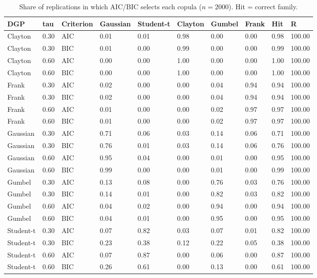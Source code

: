 \begin{table}[htbp]\centering\small
\caption{Share of replications in which AIC/BIC selects each copula ($n = 2000$). Hit = correct family.}\label{tab:mc-select}
\begin{tabular}{llllllllll}
\hline
DGP & tau & Criterion & Gaussian & Student-t & Clayton & Gumbel & Frank & Hit & R
\\ \hline
Clayton & 0.30 & AIC & 0.01 & 0.01 & 0.98 & 0.00 & 0.00 & 0.98 & 100.00 \\
Clayton & 0.30 & BIC & 0.01 & 0.00 & 0.99 & 0.00 & 0.00 & 0.99 & 100.00 \\
Clayton & 0.60 & AIC & 0.00 & 0.00 & 1.00 & 0.00 & 0.00 & 1.00 & 100.00 \\
Clayton & 0.60 & BIC & 0.00 & 0.00 & 1.00 & 0.00 & 0.00 & 1.00 & 100.00 \\
Frank & 0.30 & AIC & 0.02 & 0.00 & 0.00 & 0.04 & 0.94 & 0.94 & 100.00 \\
Frank & 0.30 & BIC & 0.02 & 0.00 & 0.00 & 0.04 & 0.94 & 0.94 & 100.00 \\
Frank & 0.60 & AIC & 0.01 & 0.00 & 0.00 & 0.02 & 0.97 & 0.97 & 100.00 \\
Frank & 0.60 & BIC & 0.01 & 0.00 & 0.00 & 0.02 & 0.97 & 0.97 & 100.00 \\
Gaussian & 0.30 & AIC & 0.71 & 0.06 & 0.03 & 0.14 & 0.06 & 0.71 & 100.00 \\
Gaussian & 0.30 & BIC & 0.76 & 0.01 & 0.03 & 0.14 & 0.06 & 0.76 & 100.00 \\
Gaussian & 0.60 & AIC & 0.95 & 0.04 & 0.00 & 0.01 & 0.00 & 0.95 & 100.00 \\
Gaussian & 0.60 & BIC & 0.99 & 0.00 & 0.00 & 0.01 & 0.00 & 0.99 & 100.00 \\
Gumbel & 0.30 & AIC & 0.13 & 0.08 & 0.00 & 0.76 & 0.03 & 0.76 & 100.00 \\
Gumbel & 0.30 & BIC & 0.14 & 0.01 & 0.00 & 0.82 & 0.03 & 0.82 & 100.00 \\
Gumbel & 0.60 & AIC & 0.04 & 0.02 & 0.00 & 0.94 & 0.00 & 0.94 & 100.00 \\
Gumbel & 0.60 & BIC & 0.04 & 0.01 & 0.00 & 0.95 & 0.00 & 0.95 & 100.00 \\
Student-t & 0.30 & AIC & 0.07 & 0.82 & 0.03 & 0.07 & 0.01 & 0.82 & 100.00 \\
Student-t & 0.30 & BIC & 0.23 & 0.38 & 0.12 & 0.22 & 0.05 & 0.38 & 100.00 \\
Student-t & 0.60 & AIC & 0.07 & 0.87 & 0.00 & 0.06 & 0.00 & 0.87 & 100.00 \\
Student-t & 0.60 & BIC & 0.26 & 0.61 & 0.00 & 0.13 & 0.00 & 0.61 & 100.00 \\
\hline\end{tabular}\end{table}
